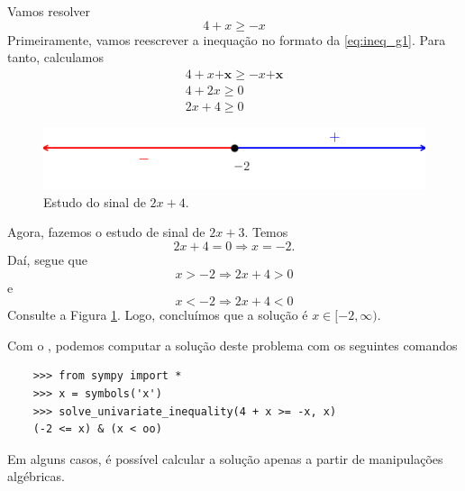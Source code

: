 \begin{ex}
  Vamos resolver
  \begin{equation}
    4 + x \geq -x
  \end{equation}
  Primeiramente, vamos reescrever a inequação no formato da \eqref{eq:ineq_g1}. Para tanto, calculamos
  \begin{gather}
    4 + x \pmb{+ x} \geq - x \pmb{ + x}\\
    4 + 2x \geq 0\\
    2x + 4 \geq 0
  \end{gather}

\begin{figure}[H]
  \centering
  \includegraphics{./cap_ineq/dados/fig_ex_ineq_g1ap/fig}
  \caption{Estudo do sinal de $2x + 4$.}
  \label{fig:ex_ineq_g1ap}
\end{figure}  
  
  Agora, fazemos o estudo de sinal de $2x + 3$. Temos
  \begin{equation}
    2x + 4 = 0 \Rightarrow x = -2.
  \end{equation}
  Daí, segue que
  \begin{equation}
    x > -2 \Rightarrow 2x + 4 > 0
  \end{equation}
  e
  \begin{equation}
    x < -2 \Rightarrow 2x + 4 < 0
  \end{equation}
  Consulte a Figura \ref{fig:ex_ineq_g1ap}. Logo, concluímos que a solução é $x\in [-2, \infty)$.

  \ifispython
  Com o {\sympy}, podemos computar a solução deste problema com os seguintes comandos
  \begin{lstlisting}
    >>> from sympy import *
    >>> x = symbols('x')
    >>> solve_univariate_inequality(4 + x >= -x, x)
    (-2 <= x) & (x < oo)
  \end{lstlisting}
  \fi
\end{ex}

Em alguns casos, é possível calcular a solução apenas a partir de manipulações algébricas.

